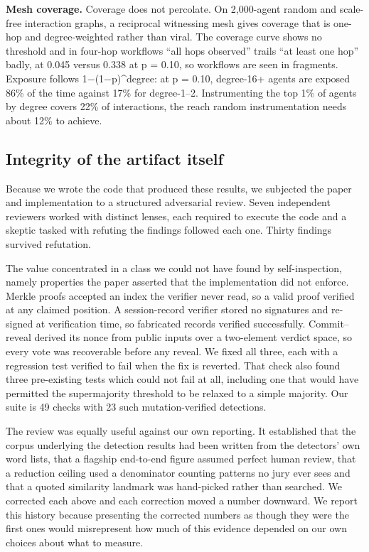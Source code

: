 \documentclass[conference]{IEEEtran}
\begin{document}
\textbf{Mesh coverage.} Coverage does not percolate. On 2,000-agent random and scale-free interaction graphs, a reciprocal witnessing mesh gives coverage that is one-hop and degree-weighted rather than viral. The coverage curve shows no threshold and in four-hop workflows ``all hops observed'' trails ``at least one hop'' badly, at 0.045 versus 0.338 at p = 0.10, so workflows are seen in fragments. Exposure follows 1$-$(1$-$p)\textasciicircum{}degree: at p = 0.10, degree-16+ agents are exposed 86\% of the time against 17\% for degree-1--2. Instrumenting the top 1\% of agents by degree covers 22\% of interactions, the reach random instrumentation needs about 12\% to achieve.

\subsection{Integrity of the artifact itself}

Because we wrote the code that produced these results, we subjected the paper and implementation to a structured adversarial review. Seven independent reviewers worked with distinct lenses, each required to execute the code and a skeptic tasked with refuting the findings followed each one. Thirty findings survived refutation.

The value concentrated in a class we could not have found by self-inspection, namely properties the paper asserted that the implementation did not enforce. Merkle proofs accepted an index the verifier never read, so a valid proof verified at any claimed position. A session-record verifier stored no signatures and re-signed at verification time, so fabricated records verified successfully. Commit--reveal derived its nonce from public inputs over a two-element verdict space, so every vote was recoverable before any reveal. We fixed all three, each with a regression test verified to fail when the fix is reverted. That check also found three pre-existing tests which could not fail at all, including one that would have permitted the supermajority threshold to be relaxed to a simple majority. Our suite is 49 checks with 23 such mutation-verified detections.

The review was equally useful against our own reporting. It established that the corpus underlying the detection results had been written from the detectors' own word lists, that a flagship end-to-end figure assumed perfect human review, that a reduction ceiling used a denominator counting patterns no jury ever sees and that a quoted similarity landmark was hand-picked rather than searched. We corrected each above and each correction moved a number downward. We report this history because presenting the corrected numbers as though they were the first ones would misrepresent how much of this evidence depended on our own choices about what to measure.
\end{document}
